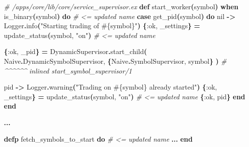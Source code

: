 \documentclass[
  oneside]{book}
\newenvironment{Shaded}{\begin{snugshade}}{\end{snugshade}}
\newcommand{\CommentTok}[1]{\textcolor[rgb]{0.56,0.35,0.01}{\textit{#1}}}
\newcommand{\ConstantTok}[1]{\textcolor[rgb]{0.56,0.35,0.01}{#1}}
\newcommand{\FunctionTok}[1]{\textcolor[rgb]{0.13,0.29,0.53}{\textbf{#1}}}
\newcommand{\KeywordTok}[1]{\textcolor[rgb]{0.13,0.29,0.53}{\textbf{#1}}}
\newcommand{\NormalTok}[1]{#1}
\newcommand{\OperatorTok}[1]{\textcolor[rgb]{0.81,0.36,0.00}{\textbf{#1}}}
\newcommand{\OtherTok}[1]{\textcolor[rgb]{0.56,0.35,0.01}{#1}}
\newcommand{\StringTok}[1]{\textcolor[rgb]{0.31,0.60,0.02}{#1}}
\newcommand{\VariableTok}[1]{\textcolor[rgb]{0.00,0.00,0.00}{#1}}
\begin{document}
\begin{Shaded}
\begin{Highlighting}[]
  \CommentTok{\# /apps/core/lib/core/service\_supervisor.ex}
  \KeywordTok{def}\NormalTok{ start\_worker}\FunctionTok{(}\NormalTok{symbol}\FunctionTok{)} \KeywordTok{when}\NormalTok{ is\_binary}\FunctionTok{(}\NormalTok{symbol}\FunctionTok{)} \KeywordTok{do} \CommentTok{\# \textless{}= updated name}
    \KeywordTok{case}\NormalTok{ get\_pid}\FunctionTok{(}\NormalTok{symbol}\FunctionTok{)} \KeywordTok{do}
      \ConstantTok{nil} \OperatorTok{{-}\textgreater{}}
        \ConstantTok{Logger}\OperatorTok{.}\NormalTok{info}\FunctionTok{(}\StringTok{"Starting trading of }\OtherTok{\#\{}\NormalTok{symbol}\OtherTok{\}}\StringTok{"}\FunctionTok{)}
        \FunctionTok{\{}\VariableTok{:ok}\NormalTok{, \_settings}\FunctionTok{\}} \OperatorTok{=}\NormalTok{ update\_status}\FunctionTok{(}\NormalTok{symbol, }\StringTok{"on"}\FunctionTok{)} \CommentTok{\# \textless{}= updated name}

        \FunctionTok{\{}\VariableTok{:ok}\NormalTok{, \_pid}\FunctionTok{\}} \OperatorTok{=}
          \ConstantTok{DynamicSupervisor}\OperatorTok{.}\NormalTok{start\_child}\FunctionTok{(}
            \ConstantTok{Naive}\OperatorTok{.}\ConstantTok{DynamicSymbolSupervisor}\NormalTok{,}
            \FunctionTok{\{}\ConstantTok{Naive}\OperatorTok{.}\ConstantTok{SymbolSupervisor}\NormalTok{, symbol}\FunctionTok{\}}
          \FunctionTok{)}  \CommentTok{\# \^{}\^{}\^{}\^{}\^{}\^{} inlined \textasciigrave{}start\_symbol\_supervisor/1\textasciigrave{}}

\NormalTok{      pid }\OperatorTok{{-}\textgreater{}}
        \ConstantTok{Logger}\OperatorTok{.}\NormalTok{warning}\FunctionTok{(}\StringTok{"Trading on }\OtherTok{\#\{}\NormalTok{symbol}\OtherTok{\}}\StringTok{ already started"}\FunctionTok{)}
        \FunctionTok{\{}\VariableTok{:ok}\NormalTok{, \_settings}\FunctionTok{\}} \OperatorTok{=}\NormalTok{ update\_status}\FunctionTok{(}\NormalTok{symbol, }\StringTok{"on"}\FunctionTok{)} \CommentTok{\# \textless{}= updated name}
        \FunctionTok{\{}\VariableTok{:ok}\NormalTok{, pid}\FunctionTok{\}}
    \KeywordTok{end}
  \KeywordTok{end}

  \OperatorTok{...}

  \KeywordTok{defp}\NormalTok{ fetch\_symbols\_to\_start }\KeywordTok{do} \CommentTok{\# \textless{}= updated name}
    \OperatorTok{...}
  \KeywordTok{end}  
\end{Highlighting}
\end{Shaded}
\end{document}
